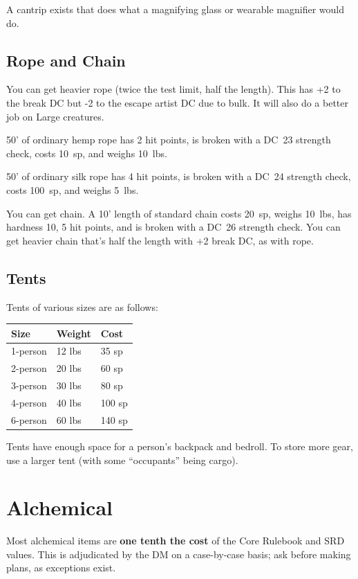 A cantrip exists that does what a magnifying glass or wearable magnifier
would do.

%
\subsection{Rope and Chain}

You can get heavier rope (twice the test limit, half the length). This
has +2 to the break DC but -2 to the escape artist DC due to bulk. It will
also do a better job on Large creatures.

50' of ordinary hemp rope has 2 hit points, is broken with a DC~23 strength
check, costs 10~sp, and weighs 10~lbs.

50' of ordinary silk rope has 4 hit points, is broken with a DC~24 strength
check, costs 100~sp, and weighs 5~lbs.

You can get chain. A 10' length of standard chain costs 20~sp, weighs
10~lbs, has hardness 10, 5 hit points, and is broken with a DC~26 strength
check. You can get heavier chain that's half the length with +2 break DC,
as with rope.
%

%
\subsection{Tents}

Tents of various sizes are as follows:

\begin{tabular}{lll}\hline
\textbf{Size} & \textbf{Weight} & \textbf{Cost} \\ \hline
1-person & 12 lbs & 35 sp \\
2-person & 20 lbs & 60 sp \\
3-person & 30 lbs & 80 sp \\
4-person & 40 lbs & 100 sp \\
6-person & 60 lbs & 140 sp \\
\hline
\end{tabular}

Tents have enough space for a person's backpack and bedroll. To store more
gear, use a larger tent (with some ``occupants'' being cargo).
%

%
%
\section{Alchemical}

Most alchemical items are \textbf{one tenth the cost} of the Core Rulebook
and SRD values. This is adjudicated by the DM on a case-by-case basis; ask
before making plans, as exceptions exist.

